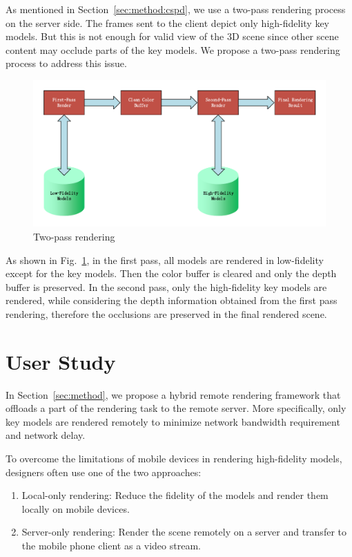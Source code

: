 As mentioned in Section~\ref{sec:method:cspd}, we use a two-pass rendering process on the server side.
The frames sent to the client depict only high-fidelity key models.
But this is not enough for valid view of the 3D scene since other scene content may occlude parts of the key models.
We propose a two-pass rendering process to address this issue.

\begin{figure}[!htbp]
	\includegraphics[width=\textwidth]{figures/two-pass-rendering.pdf}
	\caption{Two-pass rendering}
	\label{fig:tp-rendering}
\end{figure}

As shown in Fig.~\ref{fig:tp-rendering}, in the first pass, all models are rendered in low-fidelity except for the key models. Then the color buffer is cleared and only the depth buffer is preserved. In the second pass, only the high-fidelity key models are rendered, while considering the depth information obtained from the first pass rendering, therefore the occlusions are preserved in the final rendered scene.

\section{User Study}
\label{sec:userstudy}

In Section~\ref{sec:method}, we propose a hybrid remote rendering framework that offloads a part of the rendering task to the remote server. More specifically, only key models are rendered remotely to minimize network bandwidth requirement and network delay.

To overcome the limitations of mobile devices in rendering high-fidelity models, designers often use one of the two approaches:
\begin{enumerate}
\item
Local-only rendering: Reduce the fidelity of the models and render them locally on mobile devices.
\item
Server-only rendering: Render the scene remotely on a server and transfer to the mobile phone client as a video stream.
\end{enumerate}

